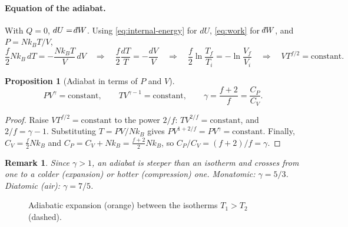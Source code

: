 \documentclass{article}
\newtheorem{remark}{Remark}
\newtheorem{proposition}{Proposition}
\newcommand{\dbar}{\mathchar'26\mkern-12mu d}
\begin{document}
\paragraph{Equation of the adiabat.}
With $Q = 0$, $dU = \dbar W$. Using \eqref{eq:internal-energy} for $dU$, \eqref{eq:work} for $\dbar W$, and $P = Nk_BT/V$,
\[\frac{f}{2} N k_B \, dT = -\frac{Nk_BT}{V} \, dV \quad\Longrightarrow\quad \frac{f}{2} \frac{dT}{T} = -\frac{dV}{V} \quad\Longrightarrow\quad \frac{f}{2} \ln\frac{T_f}{T_i} = -\ln\frac{V_f}{V_i} \quad\Longrightarrow\quad V T^{f/2} = \text{constant}.\]

\begin{proposition}[Adiabat in terms of $P$ and $V$]
    \[P V^{\gamma} = \text{constant}, \qquad TV^{\gamma - 1} = \text{constant}, \qquad \gamma = \frac{f+2}{f} = \frac{C_P}{C_V}.\]
\end{proposition}
\begin{proof}
    Raise $VT^{f/2} = \text{constant}$ to the power $2/f$: $TV^{2/f} = \text{constant}$, and $2/f = \gamma - 1$. Substituting $T = PV/Nk_B$ gives $PV^{1 + 2/f} = PV^\gamma = \text{constant}$. Finally, $C_V = \tfrac{f}{2}Nk_B$ and $C_P = C_V + Nk_B = \tfrac{f+2}{2}Nk_B$, so $C_P/C_V = (f+2)/f = \gamma$.
\end{proof}

\begin{remark}
    Since $\gamma > 1$, an adiabat is steeper than an isotherm and crosses from one to a colder (expansion) or hotter (compression) one. Monatomic: $\gamma = 5/3$. Diatomic (air): $\gamma = 7/5$.
\end{remark}

\begin{figure}[H]
    \centering
    \caption{Adiabatic expansion (orange) between the isotherms $T_1 > T_2$ (dashed).}
    \label{fig:adiabat}
\end{figure}
\end{document}
